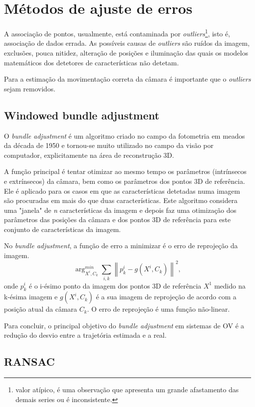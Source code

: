 \section{Métodos de ajuste de erros}

A associação de pontos, usualmente, está contaminada por \textit{outliers}\footnote{valor atípico, é uma observação que apresenta um grande afastamento das demais series ou é inconsistente.}, isto é, associação de dados errada. As possíveis causas de \textit{outliers} são ruídos da imagem, exclusões, pouca nitidez, alteração de posições e iluminação das quais os modelos matemáticos dos detetores de características não detetam. 

Para  a estimação da movimentação correta da câmara é importante que o \textit{outliers} sejam removidos. 

\subsection{Windowed bundle adjustment}

O \textit{bundle adjustment} é um algoritmo criado no campo da fotometria em meados da década de 1950 e tornou-se muito utilizado no campo da visão por computador, explicitamente na área de reconstrução 3D.

A função principal é tentar otimizar ao mesmo tempo os parâmetros (intrínsecos e extrínsecos) da câmara, bem como os parâmetros dos pontos 3D de referência. Ele é aplicado para os casos em que as características detetadas numa imagem são procuradas em mais do que duas características. Este algoritmo considera uma "janela" de \textit{n} características da imagem e depois faz uma otimização dos parâmetros das posições da câmara e dos pontos 3D de referência para este conjunto de características da imagem.

No \textit{bundle adjustment}, a função de erro a minimizar é o erro de reprojeção da imagem. 
\[ \arg_{X^i,C_k}^{min} \sum_{i,k}{\left \| p_k^i - g(X^i,C_k) \right \|}^2,\]
onde $p_k^i$ é o i-ésimo ponto da imagem dos pontos 3D de referência \textit{$X^1$} medido na k-ésima imagem e $\textit{g}(X^i,C_k)$ é a sua imagem de reprojeção de acordo com a posição atual da câmara $C_k$. O erro de reprojeção é uma função não-linear.

Para concluir, o principal objetivo do \textit{bundle adjustment} em sistemas de OV é a redução do desvio entre a trajetória estimada e a real.

\subsection{RANSAC}


